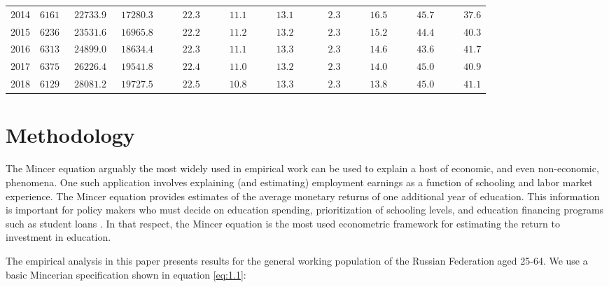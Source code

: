\documentclass[alpha-refs]{wiley-article-01g}
\begin{document}
\begin{table}[ht]
{\begin{tabular}{lcccccccccc}
2014  & $6161$ & $\phantom{0}22733.9$ & $\phantom{0}17280.3$ & $\phantom{0000}22.3$ & $\phantom{0000}11.1$ & $\phantom{0000}13.1$ & $\phantom{00000}2.3$ & $\phantom{0000}16.5$ & $\phantom{0000}45.7$ & $\phantom{0000}37.6$ \\
2015  & $6236$ & $\phantom{0}23531.6$ & $\phantom{0}16965.8$ & $\phantom{0000}22.2$ & $\phantom{0000}11.2$ & $\phantom{0000}13.2$ & $\phantom{00000}2.3$ & $\phantom{0000}15.2$ & $\phantom{0000}44.4$ & $\phantom{0000}40.3$ \\
2016  & $6313$ & $\phantom{0}24899.0$ & $\phantom{0}18634.4$ & $\phantom{0000}22.3$ & $\phantom{0000}11.1$ & $\phantom{0000}13.3$ & $\phantom{00000}2.3$ & $\phantom{0000}14.6$ & $\phantom{0000}43.6$ & $\phantom{0000}41.7$ \\
2017  & $6375$ & $\phantom{0}26226.4$ & $\phantom{0}19541.8$ & $\phantom{0000}22.4$ & $\phantom{0000}11.0$ & $\phantom{0000}13.2$ & $\phantom{00000}2.3$ & $\phantom{0000}14.0$ & $\phantom{0000}45.0$ & $\phantom{0000}40.9$ \\
2018  & $6129$ & $\phantom{0}28081.2$ & $\phantom{0}19727.5$ & $\phantom{0000}22.5$ & $\phantom{0000}10.8$ & $\phantom{0000}13.3$ & $\phantom{00000}2.3$ & $\phantom{0000}13.8$ & $\phantom{0000}45.0$ & $\phantom{0000}41.1$ \\
\hline 
\end{tabular}	
	}
\end{table}

\section{Methodology}

The Mincer equation \textendash arguably the most widely used in empirical work \textendash can be used to explain a host of economic, and even non-economic, phenomena. One such application involves explaining (and estimating) employment earnings as a function of schooling and labor market experience. The Mincer equation provides estimates of the average monetary returns of one additional year of education. This information is important for policy makers who must decide on education spending, prioritization of schooling levels, and education financing programs such as student loans \parencite{Patrinos2016}. In that respect, the Mincer equation is the most used econometric framework for estimating the return to investment in education.


The empirical analysis in this paper presents results for the general working population of the Russian Federation aged 25-64. We use a basic Mincerian specification shown in equation \eqref{eq:1.1}: 
\end{document}
